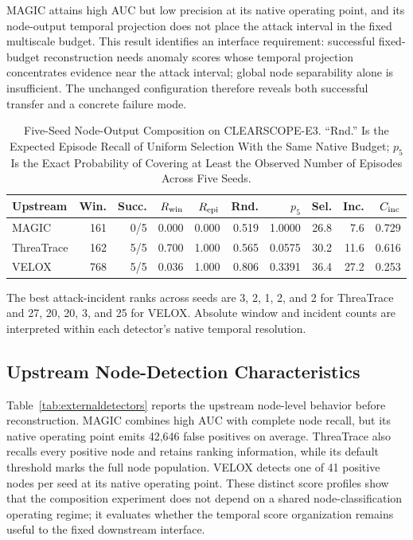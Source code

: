 \documentclass[lettersize,journal]{IEEEtran}
\begin{document}
MAGIC attains high AUC but low precision at its native operating point, and its
node-output temporal projection does not place the attack interval in the fixed
multiscale budget.  This result identifies an interface requirement: successful
fixed-budget reconstruction needs anomaly scores whose temporal projection
concentrates evidence near the attack interval; global node separability alone
is insufficient.  The unchanged configuration therefore reveals both successful
transfer and a concrete failure mode.

\begin{table}[!t]
\caption{Five-Seed Node-Output Composition on CLEARSCOPE-E3.  ``Rnd.'' Is the
Expected Episode Recall of Uniform Selection With the Same Native Budget; $p_5$
Is the Exact Probability of Covering at Least the Observed Number of Episodes
Across Five Seeds.}
\label{tab:externalcomposition}
\centering
\footnotesize
\setlength{\tabcolsep}{3.8pt}
\begin{tabular}{lrrrrrrrrr}
\toprule
Upstream & Win. & Succ. & $R_{\rm win}$ & $R_{\rm epi}$ & Rnd. & $p_5$ & Sel. & Inc. & $C_{\rm inc}$\\
\midrule
MAGIC      & 161 & 0/5 & 0.000 & 0.000 & 0.519 & 1.0000 & 26.8 & 7.6  & 0.729\\
ThreaTrace & 162 & 5/5 & 0.700 & 1.000 & 0.565 & 0.0575 & 30.2 & 11.6 & 0.616\\
VELOX      & 768 & 5/5 & 0.036 & 1.000 & 0.806 & 0.3391 & 36.4 & 27.2 & 0.253\\
\bottomrule
\end{tabular}
\end{table}

The best attack-incident ranks across seeds are 3, 2, 1, 2, and 2 for
ThreaTrace and 27, 20, 20, 3, and 25 for VELOX.  Absolute window and incident
counts are interpreted within each detector's native temporal resolution.

\subsection{Upstream Node-Detection Characteristics}

Table~\ref{tab:externaldetectors} reports the upstream node-level behavior
before reconstruction.  MAGIC combines high AUC with complete node recall, but
its native operating point emits 42,646 false positives on average.  ThreaTrace
also recalls every positive node and retains ranking information, while its
default threshold marks the full node population.  VELOX detects one of 41
positive nodes per seed at its native operating point.  These distinct score
profiles show that the composition experiment does not depend on a shared
node-classification operating regime; it evaluates whether the temporal score
organization remains useful to the fixed downstream interface.
\end{document}
